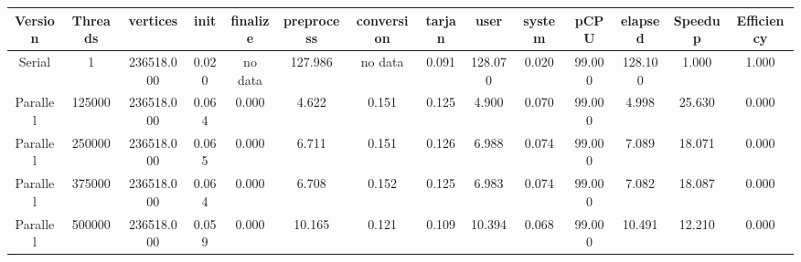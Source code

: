 \begin{tabular}{|c|c|c|c|c|c|c|c|c|c|c|c|c|c|}
\toprule
 Version &  Threads &   vertices &  init & finalize &  preprocess & conversion &  tarjan &    user &  system &   pCPU &  elapsed &  Speedup &  Efficiency \\
\midrule
  Serial &        1 & 236518.000 & 0.020 &  no data &     127.986 &    no data &   0.091 & 128.070 &   0.020 & 99.000 &  128.100 &    1.000 &       1.000 \\
Parallel &   125000 & 236518.000 & 0.064 &    0.000 &       4.622 &      0.151 &   0.125 &   4.900 &   0.070 & 99.000 &    4.998 &   25.630 &       0.000 \\
Parallel &   250000 & 236518.000 & 0.065 &    0.000 &       6.711 &      0.151 &   0.126 &   6.988 &   0.074 & 99.000 &    7.089 &   18.071 &       0.000 \\
Parallel &   375000 & 236518.000 & 0.064 &    0.000 &       6.708 &      0.152 &   0.125 &   6.983 &   0.074 & 99.000 &    7.082 &   18.087 &       0.000 \\
Parallel &   500000 & 236518.000 & 0.059 &    0.000 &      10.165 &      0.121 &   0.109 &  10.394 &   0.068 & 99.000 &   10.491 &   12.210 &       0.000 \\
\bottomrule
\end{tabular}
